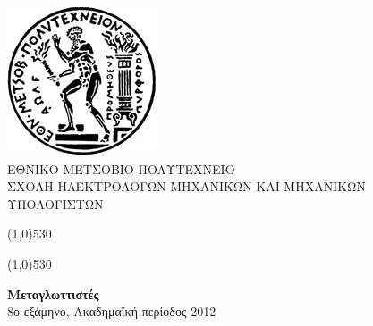 \documentclass[12pt]{article}
\begin{document}
\begin{titlepage}
\begin{center}

\includegraphics[scale=0.3]{pyrforos.jpg}\\
ΕΘΝΙΚΟ ΜΕΤΣΟΒΙΟ ΠΟΛΥΤΕΧΝΕΙΟ \\
ΣΧΟΛΗ ΗΛΕΚΤΡΟΛΟΓΩΝ ΜΗΧΑΝΙΚΩΝ KΑΙ ΜΗΧΑΝΙΚΩΝ ΥΠΟΛΟΓΙΣΤΩΝ \\ 
\vspace{0.5em}

\medskip 

\def\doubleline{

    \vspace{0.1em}
    \line(1,0){530}\

    \vspace{-1.5em}
    \line(1,0){530}

}
\doubleline
\vspace{1.3em}

{\large \textbf{Μεταγλωττιστές}\\
 \medskip
8ο εξάμηνο, Ακαδημαϊκή περίοδος 2012 \\ \bigskip \medskip}


\end{center}
\end{titlepage}
\end{document}
